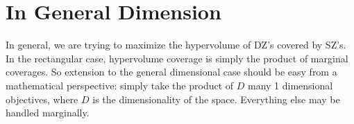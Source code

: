 \documentclass[a4paper]{article}
\begin{document}
\section{In General Dimension}

In general, we are trying to maximize the hypervolume of DZ's covered by SZ's. In the rectangular case, hypervolume coverage is simply the product of marginal coverages. So extension to the general dimensional case should be easy from a mathematical perspective: simply take the product of $D$ many 1 dimensional objectives, where $D$ is the dimensionality of the space. Everything else may be handled marginally.
\end{document}
